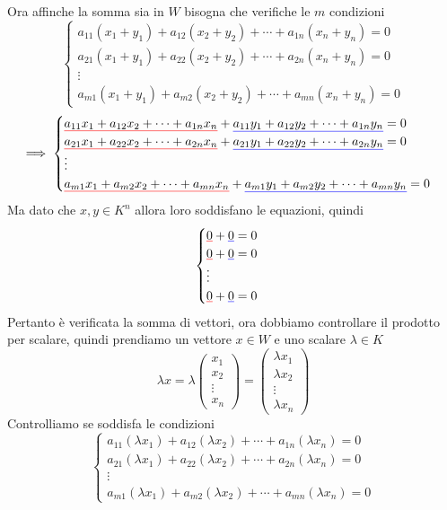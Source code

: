 \documentclass{rapport}
\def\mathunderline#1#2{\color{#1}\underline{{\color{black}#2}}\color{black}}
\begin{document}
Ora affinche la somma sia in $W$ bisogna che verifiche le $m$ condizioni 
\[
\begin{cases}
  a_{11} (x_1+y_1) + a_{12} (x_2+y_2) + \cdots + a_{1n} (x_n+y_n) = 0 \\
  a_{21} (x_1+y_1) + a_{22} (x_2+y_2) + \cdots + a_{2n} (x_n+y_n) = 0 \\
  \vdots \\
  a_{m1} (x_1+y_1) + a_{m2} (x_2+y_2) + \cdots + a_{mn} (x_n+y_n) = 0
\end{cases}
\]
\[
\implies
\begin{cases}
  \mathunderline{red}{a_{11} x_1 + a_{12} x_2 + \cdots + a_{1n} x_n} + \mathunderline{blue}{a_{11} y_1 + a_{12} y_2 + \cdots + a_{1n} y_n} = 0 \\
  \mathunderline{red}{a_{21} x_1 + a_{22} x_2 + \cdots + a_{2n} x_n} + \mathunderline{blue}{a_{21} y_1 + a_{22} y_2 + \cdots + a_{2n} y_n} = 0 \\
  \vdots \\
  \mathunderline{red}{a_{m1} x_1 + a_{m2} x_2 + \cdots + a_{mn} x_n} + \mathunderline{blue}{a_{m1} y_1 + a_{m2} y_2 + \cdots + a_{mn} y_n} = 0 \\
  \end{cases}
\]
Ma dato che $x,y\in K^n$ allora loro soddisfano le equazioni, quindi 
\[
  \begin{cases}
  \mathunderline{red}{0} + \mathunderline{blue}{0} = 0   \\
  \mathunderline{red}{0} + \mathunderline{blue}{0} = 0   \\
    \vdots \\
 \mathunderline{red}{0} + \mathunderline{blue}{0} = 0   
\end{cases}
\]
Pertanto è verificata la somma di vettori, ora dobbiamo controllare il prodotto per scalare, quindi prendiamo un vettore $x\in W$ e uno scalare $\lambda \in K$
\[
  \lambda x = \lambda \begin{pmatrix}
  x_1 \\
  x_2 \\
  \vdots \\
  x_n
\end{pmatrix}  = \begin{pmatrix}
  \lambda x_1  \\
  \lambda x_2 \\
  \vdots \\
  \lambda x_n 
\end{pmatrix}
  \] 
  Controlliamo se soddisfa le condizioni
  \[
\begin{cases}
  a_{11} (\lambda x_1) + a_{12} (\lambda x_2) + \cdots + a_{1n} (\lambda x_n) = 0 \\
  a_{21} (\lambda x_1) + a_{22} (\lambda x_2) + \cdots + a_{2n} (\lambda x_n) = 0 \\
  \vdots \\
  a_{m1} (\lambda x_1) + a_{m2} (\lambda x_2) + \cdots + a_{mn} (\lambda x_n) = 0
\end{cases}
\]
\end{document}
